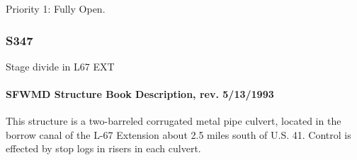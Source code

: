 \begin{packed_items}
\item Priority 1: Fully Open.
\end{packed_items}

%
%
%

\clearpage
\subsubsection{S347}
Stage divide in L67 EXT

\paragraph{SFWMD Structure Book Description, rev. 5/13/1993}
This structure is a two-barreled corrugated metal pipe culvert, located in the borrow canal of
the L-67 Extension about 2.5 miles south of U.S. 41. Control is effected by stop logs in risers in each
culvert.

